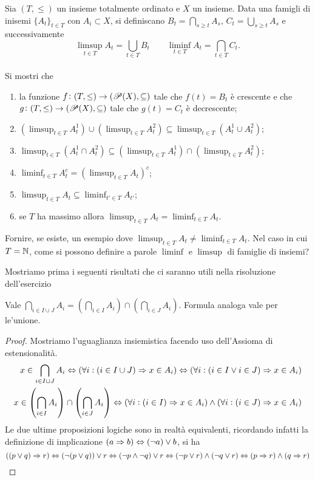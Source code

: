 \begin{es}
  Sia $ (T, \leq) $ un insieme totalmente ordinato e $ X $ un insieme. Data una famigli di inisemi $ \{A_t\}_{t \in T} $ con $ A_i \subset X $, si definiscano $ B_t = \bigcap_{s \geq t} A_s $, $ C_t = \bigcup_{s \geq t} A_s $ e successivamente \[\limsup_{t \in T} A_t = \bigcup_{t \in T} B_t \qquad \liminf_{t \in T} A_t = \bigcap_{t \in T} C_t.\]\\
  Si mostri che
  \begin{enumerate}
  \item la funzione $ f \colon (T, \leq) \to (\P(X), \subseteq) $ tale che $ f(t) = B_t $ è crescente e che $ g \colon (T, \leq) \to (\P(X), \subseteq) $ tale che $ g(t) = C_t $ è decrescente;
  \item $ (\limsup_{t \in T} A_t^1) \cup (\limsup_{t \in T}A_t^2) \subseteq \limsup_{t \in T} (A_t^1 \cup A_t^2) $;
  \item $ \limsup_{t \in T} (A_t^1 \cap A_t^2) \subseteq (\limsup_{t \in T} A_t^1) \cap (\limsup_{t \in T}A_t^2) $;
  \item $ \liminf_{t \in T} A_t^c = (\limsup_{t \in T} A_t)^c $;
  \item $ \limsup_{t \in T} A_t \subseteq \liminf_{t' \in T} A_{t'} $;
  \item se $ T $ ha massimo allora $ \limsup_{t \in T} A_t = \liminf_{t \in T} A_t $.
  \end{enumerate}
  Fornire, se esiste, un esempio dove $ \limsup_{t \in T} A_t \neq \liminf_{t \in T} A_t $. Nel caso in cui $ T = \N $, come si possono definire a parole $ \liminf $ e $ \limsup $ di famiglie di insiemi?
\end{es}


Mostriamo prima i seguenti risultati che ci saranno utili nella risoluzione dell'esercizio

\begin{lemma}
  Vale $ \bigcap_{i \in I \cup J} A_i = \left (\bigcap_{i \in I} A_i \right ) \cap \left (\bigcap_{i \in J} A_i \right ) $. Formula analoga vale per le'unione.
\end{lemma}
\begin{proof}
  Mostriamo l'uguaglianza insiemistica facendo uso dell'Assioma di estensionalità.
  \begin{align*}
    x \in \bigcap_{i \in I \cup J} A_i \iff (\forall i : (i \in I \cup J) \Rightarrow x \in A_i ) \iff (\forall i : (i \in I \vel i \in J) \Rightarrow x \in A_i ) \\
    x \in \left (\bigcap_{i \in I} A_i \right ) \cap \left (\bigcap_{i \in J} A_i \right ) \iff  (\forall i : (i \in I) \Rightarrow x \in A_i) \wedge (\forall i : (i \in J) \Rightarrow x \in A_i)
  \end{align*}
  Le due ultime proposizioni logiche sono in realtà equivalenti, ricordando infatti la definizione di implicazione $ (a \Rightarrow b) \iff (\neg a) \vel b $, si ha
  \[((p \vel q) \Rightarrow r) \iff (\neg (p \vel q)) \vel r \iff (\neg p \wedge \neg q) \vel r \iff (\neg p \vel r) \wedge (\neg q \vel r) \iff (p \Rightarrow r) \wedge (q \Rightarrow r) \qedhere\]
\end{proof}

